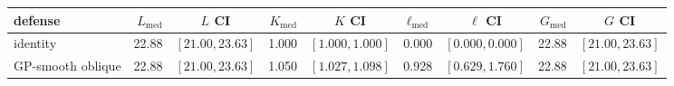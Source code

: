 \footnotesize
\setlength{\tabcolsep}{3pt}
\begin{tabular}{l r c r c r c r c}
\toprule
defense & $L_{\mathrm{med}}$ & $L$ CI & $K_{\mathrm{med}}$ & $K$ CI & $\ell_{\mathrm{med}}$ & $\ell$ CI & $G_{\mathrm{med}}$ & $G$ CI \\
\midrule
identity          & 22.88 & $[21.00, 23.63]$ & 1.000 & $[1.000, 1.000]$ & 0.000 & $[0.000, 0.000]$ & 22.88 & $[21.00, 23.63]$ \\
GP-smooth oblique & 22.88 & $[21.00, 23.63]$ & 1.050 & $[1.027, 1.098]$ & 0.928 & $[0.629, 1.760]$ & 22.88 & $[21.00, 23.63]$ \\
\bottomrule
\end{tabular}
